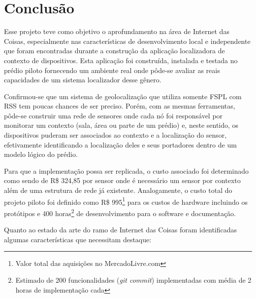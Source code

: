\chapter{Conclusão}
\label{chap:Conclusao}


Esse projeto teve como objetivo o aprofundamento na área de Internet das Coisas,
especialmente nas características de desenvolvimento local e independente que
foram encontradas durante a construção da aplicação localizadora de contexto de
dispositivos. Esta aplicação foi construída, instalada e testada no prédio
piloto fornecendo um ambiente real onde pôde-se avaliar as reais capacidades de
um sistema localizador desse gênero.

Confirmou-se que um sistema de
geolocalização que utiliza somente FSPL com RSS tem poucas chances de ser
preciso. Porém, com as mesmas ferramentas, pôde-se construir uma rede de sensores
onde cada nó foi responsável por monitorar um contexto (sala, área ou parte de um
prédio) e, neste sentido, os dispositivos puderam ser associados ao contexto e a
localização do sensor, efetivamente identificando a localização deles
e seus portadores dentro de um modelo lógico do prédio.

Para que a implementação possa ser replicada, o custo associado foi determinado
como sendo de R\$ 324,85 por sensor onde é necessário um sensor por contexto além
de uma estrutura de rede já existente. Analogamente, o custo total do projeto
piloto foi definido como R\$ 995\footnote{Valor total das aquisições no
MercadoLivre.com} para os custos de hardware incluindo os protótipos e 400
horas\footnote{Estimado de 200 funcionalidades (\emph{git commit}) implementadas
com média de 2 horas de implementação cada} de desenvolvimento para o software e
documentação.

Quanto ao estado da arte do ramo de Internet das Coisas foram identificadas
algumas características que necessitam destaque:

